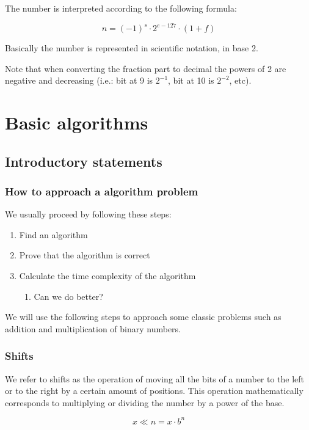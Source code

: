\documentclass[12pt]{extarticle}
\begin{document}
The number is interpreted according to the following formula:

$$
    n = (-1)^s \cdot 2^{e - 127} \cdot (1 + f)
$$

Basically the number is represented in scientific notation, in base 2.

Note that when converting the fraction part to decimal the powers of 2 are negative and decreasing
(i.e.: bit at 9 is $2^{-1}$, bit at 10 is $2^{-2}$, etc).

\section{Basic algorithms}

\subsection{Introductory statements}

\subsubsection{How to approach a algorithm problem}

We usually proceed by following these steps:
\begin{enumerate}
    \item Find an algorithm
    \item Prove that the algorithm is correct
    \item Calculate the time complexity of the algorithm
          \begin{enumerate}
              \item Can we do better?
          \end{enumerate}
\end{enumerate}

We will use the following steps to approach some classic problems such as addition and multiplication of binary numbers.

\subsubsection{Shifts}

We refer to shifts as the operation of moving all the bits of a number to the left or to the right by a certain amount of positions.
This operation mathematically corresponds to multiplying or dividing the number by a power of the base.

$$
    x \ll n = x \cdot b^n
$$
\end{document}
